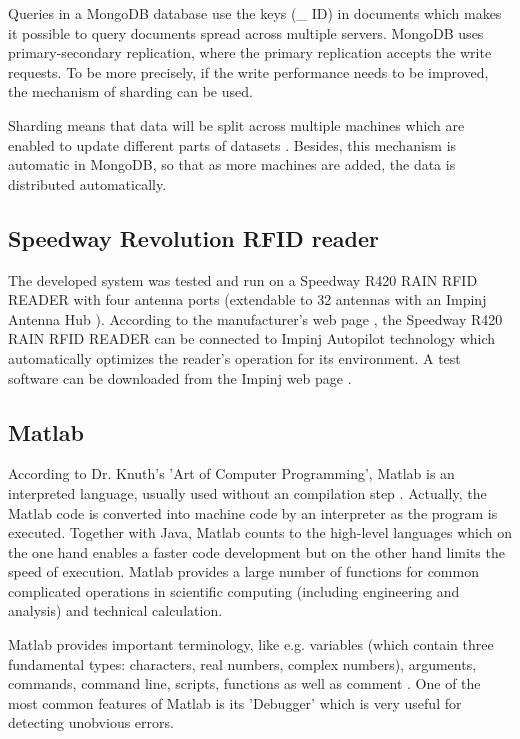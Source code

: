 Queries in a MongoDB database use the keys ({\_} ID) in documents which makes it possible to query documents spread across multiple servers. 
MongoDB uses primary-secondary replication, where the primary replication accepts the write requests. To be more precisely, if the write performance needs to be improved, the mechanism of sharding can be used. 

Sharding means that data will be split across multiple machines which are enabled to update different parts of datasets \cite[p.25 ff.]{mongodb_edward}. Besides, this mechanism is automatic in MongoDB, so that as more machines are added, the data is distributed automatically.

\subsection{Speedway Revolution RFID reader}

The developed system was tested and run on a Speedway R420 RAIN RFID READER \cite{speedway} with four antenna ports (extendable to 32 antennas with an Impinj Antenna Hub \cite{speedway}). According to the manufacturer's web page \cite{speedway}, the Speedway R420 RAIN RFID READER can be connected to Impinj Autopilot technology which automatically optimizes the reader's operation for its environment. A test software can be downloaded from the Impinj web page  \cite{speedway}.

\subsection{Matlab}

According to Dr. Knuth's 'Art of Computer Programming', Matlab is an interpreted language, usually used without an compilation step \cite[lesson 1]{introduction_matlab}. Actually, the Matlab code is converted into machine code by an interpreter as the program is executed. Together with Java, Matlab counts to the high-level languages which on the one hand enables a faster code development but on the other hand limits the speed of execution. Matlab provides a large number of functions for common complicated operations in scientific computing (including engineering and analysis) and technical calculation.

Matlab provides important terminology, like e.g. variables (which contain three fundamental types: characters, real numbers, complex numbers), arguments, commands, command line, scripts, functions as well as comment \cite[lesson 1]{introduction_matlab}. 
One of the most common features of Matlab is its 'Debugger' \cite[lesson 8]{introduction_matlab} which is very useful for detecting unobvious errors.

